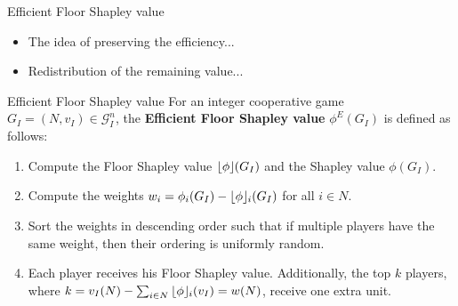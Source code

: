 \documentclass{beamer}
\newcommand{\floor}[1]{\left\lfloor #1 \right\rfloor}
\newcommand{\floorphi}{\ensuremath{\floor{\phi}\hspace{-0.5ex}}}
\begin{document}
\begin{frame}{Efficient Floor Shapley value}
    \begin{itemize}
        \item The idea of preserving the efficiency...
        \item Redistribution of the remaining value...
    \end{itemize}


    \begin{block}{Efficient Floor Shapley value}
        For an integer cooperative game $G_I=(N,v_I) \in \mathcal{G}_I^n$, the \textbf{Efficient Floor Shapley value} $\phi^E(G_I)$ is defined as follows:
        \begin{enumerate}
            \item Compute the Floor Shapley value $\floorphi(G_I)$ and the Shapley value $\phi(G_I)$.
            \item Compute the weights $w_i = \phi_i(G_I) - \floorphi_i(G_I)$ for all $i \in N$.
            \item Sort the weights in descending order such that if multiple players have the same weight, then their ordering is uniformly random.
            \item Each player receives his Floor Shapley value. Additionally, the top $k$ players, where $k = v_I(N) - \sum_{i \in N} \floorphi_i(v_I) = w(N)$, receive one extra unit.
        \end{enumerate}
    \end{block}
\end{frame}


\end{document}
